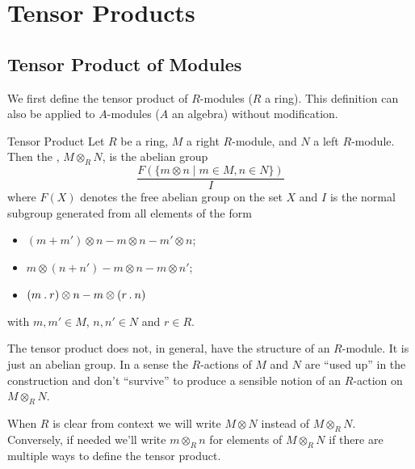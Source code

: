 \chapter{Tensor Products}
\section{Tensor Product of Modules}
We first define the tensor product of \(R\)-modules (\(R\) a ring). 
This definition can also be applied to \(A\)-modules (\(A\) an algebra) without modification.

\begin{dfn}{Tensor Product}{}
    Let \(R\) be a ring, \(M\) a right \(R\)-module, and \(N\) a left \(R\)-module.
    Then the , \(M \otimes_R N\), is the abelian group \begin{equation}
        \frac{F(\{m \otimes n \mid m \in M, n \in N\})}{I}
    \end{equation}
    where \(F(X)\) denotes the free abelian group on the set \(X\) and \(I\) is the normal subgroup generated from all elements of the form
    \begin{itemize}
        \item \((m + m') \otimes n - m \otimes n - m' \otimes n\);
        \item \(m \otimes (n + n') - m \otimes n - m \otimes n'\);
        \item \((m \mathbin{.} r) \otimes n - m \otimes (r \mathbin{.} n)\)
    \end{itemize}
    with \(m, m' \in M\), \(n, n' \in N\) and \(r \in R\).
\end{dfn}

\begin{wrn}
    The tensor product does not, in general, have the structure of an \(R\)-module.
    It is just an abelian group.
    In a sense the \(R\)-actions of \(M\) and \(N\) are \enquote{used up} in the construction and don't \enquote{survive} to produce a sensible notion of an \(R\)-action on \(M \otimes_R N\).
\end{wrn}

\begin{ntn}{}{}
    When \(R\) is clear from context we will write \(M \otimes N\) instead of \(M \otimes_R N\).
    Conversely, if needed we'll write \(m \otimes_R n\) for elements of \(M \otimes_R N\) if there are multiple ways to define the tensor product.
\end{ntn}

